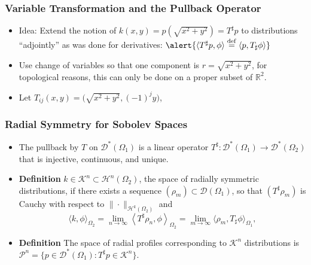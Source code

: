 \documentclass[]{beamer}
\newcommand{\R}{\ensuremath{\mathbb R}}  %
\newcommand{\HH}{\ensuremath{\mathscr H}} %
\newcommand{\KK}{\ensuremath{\mathscr K}}
\newcommand{\pp}{\ensuremath{\mathscr P}}
\newcommand{\DD}{\ensuremath{\mathscr D}}
\newcommand{\eqdef}{\stackrel{\rm def}{=}}
\begin{document}
\begin{frame}[t]
  \frametitle{Variable Transformation and the Pullback Operator}
  \begin{itemize}
    \itemsep 1.2em
    \item Idea: Extend the notion of \alert{$k(x,y) = p\left(\sqrt{x^2+y^2}\right) = T^\sharp p$} to distributions ``adjointly'' as was done for derivatives: $\alert{\langle T^\sharp p,  \phi \rangle \eqdef \langle  p,  T_\sharp\phi \rangle }$
    \item Use \alert{change of variables} so that one component is $r = \sqrt{x^2 + y^2}$, for topological reasons, this can only be done
      on a \alert{proper subset} of $\R^2$.
    \item Let $T_{ij}(x,y) = \Big(\sqrt{x^2 + y^2}, (-1)^jy\Big)$, 
    
  \end{itemize}
\end{frame}

\begin{frame}[t]
  \frametitle{Radial Symmetry for Sobolev Spaces}
  \begin{itemize}
    \itemsep 1.2em
    \item The pullback by $T$ on $\DD^*(\Omega_1)$ is a linear operator $T^\sharp:\DD^*(\Omega_1) \to \DD^*(\Omega_2)$ that is \alert{injective, continuous, and unique}. %
    \item {\bf Definition} $k\in \KK^n \subset \HH^n(\Omega_2)$, the space of \alert{radially symmetric distributions}, if there exists a sequence $(\rho_m) \subset \DD(\Omega_1)$, so that $(T^\sharp \rho_m)$ is Cauchy with respect to $\|\cdot \|_{\HH^k(\Omega_2)}$ and
  $$
  \Big\langle k,\phi\Big\rangle_{\Omega_2} = \lim_{n\to\infty}\left\langle T^\sharp \rho_n, \phi\right\rangle_{\Omega_2} = \lim_{m\to\infty}\Big\langle \rho_m, T_\sharp \phi\Big\rangle_{\Omega_1},
  $$
    \item {\bf Definition} The space of \alert{radial profiles} corresponding to $\KK^n$ distributions is $\pp^n = \{p \in \DD^*(\Omega_1): T^\sharp p \in \KK^n\}$.
  \end{itemize}
\end{frame}
\end{document}
